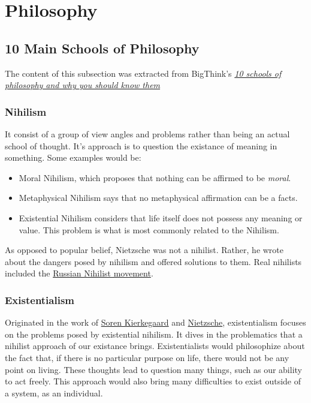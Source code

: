 \documentclass[../my_knowledge.tex]{subfiles}
\begin{document}
\chapter{Philosophy}

\newpage
\minitoc
\newpage

\section{10 Main Schools of Philosophy}
The content of this subsection was extracted from BigThink's \href{https://bigthink.com/thinking/10-schools-of-philosophy-and-why-you-should-know-them/}{\textit{10 schools of philosophy and why you should know them}} \cite{10schools}

\subsection{Nihilism}
It consist of a group of view angles and problems rather than being an actual school of thought. It's approach is to question the existance of meaning in something. Some examples would be:

\begin{itemize}
  \item Moral Nihilism, which proposes that nothing can be affirmed to be \textit{moral}.
  \item Metaphysical Nihilism says that no metaphysical affirmation can be a facts.
  \item Existential Nihilism considers that life itself does not possess any meaning or value. This problem is what is most commonly related to the Nihilism.
\end{itemize}

As opposed to popular belief, Nietzsche was not a nihilist. Rather, he wrote about the dangers posed by nihilism and offered solutions to them. Real nihilists included the
\href{https://en.wikipedia.org/wiki/Russian_nihilist_movement}{Russian Nihilist movement}.

\subsection{Existentialism}
Originated in the work of \href{https://www.youtube.com/watch?v=D9JCwkx558o}{Soren Kierkegaard} and \href{https://www.youtube.com/watch?v=wHWbZmg2hzU}{Nietzsche}, existentialism focuses on the problems posed by existential nihilism. It dives in the problematics that a nihilist approach of our existance brings. Existentialists would philosophize about the fact that, if there is no particular purpose on life, there would not be any point on living. These thoughts lead to question many things, such as our ability to act freely. This approach would also bring many difficulties to exist outside of a system, as an individual.
\end{document}
